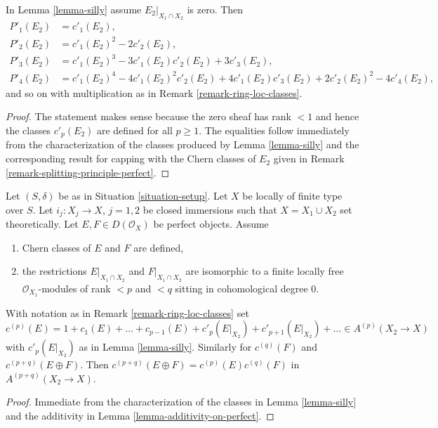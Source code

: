 \begin{lemma}
\label{lemma-silly-compose}
In Lemma \ref{lemma-silly} assume $E_2|_{X_1 \cap X_2}$ is zero. Then
\begin{align*}
P'_1(E_2) & = c'_1(E_2), \\
P'_2(E_2) & = c'_1(E_2)^2 - 2c'_2(E_2), \\
P'_3(E_2) & = c'_1(E_2)^3 - 3c'_1(E_2)c'_2(E_2) + 3c'_3(E_2), \\
P'_4(E_2) & = c'_1(E_2)^4 - 4c'_1(E_2)^2c'_2(E_2) +
4c'_1(E_2)c'_3(E_2) + 2c'_2(E_2)^2 - 4c'_4(E_2),
\end{align*}
and so on with multiplication as in Remark \ref{remark-ring-loc-classes}.
\end{lemma}

\begin{proof}
The statement makes sense because the zero sheaf has rank $< 1$ and
hence the classes $c'_p(E_2)$ are defined for all $p \geq 1$. The equalities
follow immediately from the characterization of the classes produced
by Lemma \ref{lemma-silly} and the corresponding result for
capping with the Chern classes of $E_2$ given in
Remark \ref{remark-splitting-principle-perfect}.
\end{proof}

\begin{lemma}
\label{lemma-silly-sum-c}
Let $(S, \delta)$ be as in Situation \ref{situation-setup}. Let $X$ be
locally of finite type over $S$. Let $i_j : X_j \to X$, $j = 1, 2$
be closed immersions such that $X = X_1 \cup X_2$ set theoretically. Let
$E, F \in D(\mathcal{O}_X)$ be perfect objects. Assume
\begin{enumerate}
\item Chern classes of $E$ and $F$ are defined,
\item the restrictions $E|_{X_1 \cap X_2}$ and $F|_{X_1 \cap X_2}$
are isomorphic to a finite locally free $\mathcal{O}_{X_1}$-modules
of rank $< p$ and $< q$ sitting in cohomological degree $0$.
\end{enumerate}
With notation as in Remark \ref{remark-ring-loc-classes} set
$$
c^{(p)}(E) = 1 + c_1(E) + \ldots + c_{p - 1}(E) +
c'_p(E|_{X_2}) + c'_{p + 1}(E|_{X_2}) + \ldots \in A^{(p)}(X_2 \to X)
$$
with $c'_p(E|_{X_2})$ as in Lemma \ref{lemma-silly}. Similarly
for $c^{(q)}(F)$ and $c^{(p + q)}(E \oplus F)$.
Then $c^{(p + q)}(E \oplus F) = c^{(p)}(E)c^{(q)}(F)$
in $A^{(p + q)}(X_2 \to X)$.
\end{lemma}

\begin{proof}
Immediate from the characterization of the classes in
Lemma \ref{lemma-silly} and the additivity in
Lemma \ref{lemma-additivity-on-perfect}.
\end{proof}

